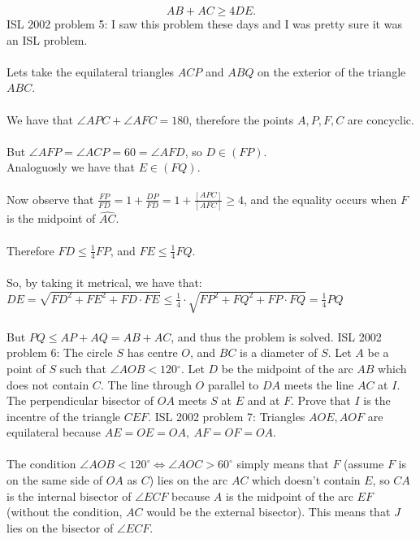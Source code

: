 \[ AB+AC\geq4DE. \] 
ISL 2002 problem 5:  I saw this problem these days and I was pretty sure it was an ISL problem. \\\\
Lets take the equilateral triangles $ ACP$ and $ ABQ$ on the exterior of the triangle $ ABC$. \\\\
We have that  $ \angle{APC} + \angle{AFC} = 180$, therefore the points $ A,P,F,C$ are concyclic. \\\\
But $ \angle{AFP} = \angle{ACP} = 60 = \angle{AFD}$, so $ D \in (FP)$. \\
Analoguosly we have that $ E \in (FQ)$. \\\\
Now observe that $ \frac {FP}{FD} = 1 + \frac {DP}{FD} = 1 + \frac {[APC]}{[AFC]}\geq 4$, and the equality occurs when $ F$ is the midpoint of $ \widehat{AC}$. \\\\
Therefore $ FD \leq \frac {1}{4}FP$, and $ FE \leq \frac {1}{4}FQ$. \\\\
So, by taking it metrical, we have that: \\
$ DE = \sqrt {FD^2 + FE^2 + FD \cdot FE}\leq \frac {1}{4}\cdot \sqrt {FP^2 + FQ^2 + FP \cdot FQ} = \frac {1}{4}PQ$ \\\\
But $ PQ \leq AP + AQ = AB + AC$, and thus the problem is solved. 
ISL 2002 problem 6:  The circle $S$ has centre $O$, and $BC$ is a diameter of $S$. Let $A$ be a point of $S$ such that $\angle AOB<120{{}^\circ}$.  Let $D$ be the midpoint of the arc $AB$ which does not contain $C$. The line through $O$ parallel to $DA$ meets the line $AC$ at $I$. The perpendicular bisector of $OA$ meets $S$ at $E$ and at $F$. Prove that $I$ is the incentre of the triangle $CEF.$ 
ISL 2002 problem 7:  Triangles $AOE,AOF$ are equilateral because $AE=OE=OA,\ AF=OF=OA$. \\\\
The condition $\angle AOB<120^{\circ}\iff \angle AOC>60^{\circ}$ simply means that $F$ (assume $F$ is on the same side of $OA$ as $C$) lies on the arc $AC$ which doesn't contain $E$, so $CA$ is the internal bisector of $\angle ECF$ because $A$ is the midpoint of the arc $EF$ (without the condition, $AC$ would be the external bisector). This means that $J$ lies on the bisector of $\angle ECF$. \\\\
